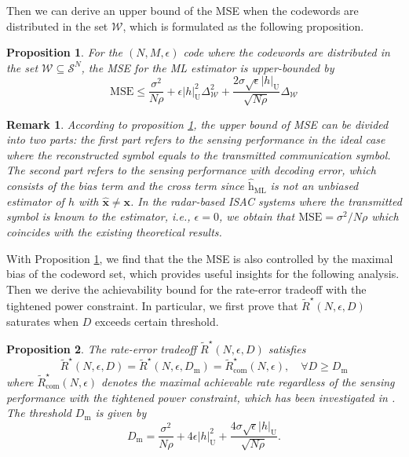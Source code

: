 \documentclass[conference,a4paper]{IEEEtran}
\newtheorem{proposition}{Proposition}
\newtheorem{remark}{Remark}
\begin{document}
Then we can derive an upper bound of the MSE when the codewords are distributed in the set $\mathcal{W}$, which is formulated as the following proposition.
\begin{proposition}
\label{Pro:Error-upperbound}
For the $(N,M,\epsilon)$ code where the codewords are distributed in the set $\mathcal{W}\subseteq \mathcal{S}^N$, the MSE for the ML estimator is upper-bounded by
\begin{equation}
\mathrm{MSE}\leq \frac{\sigma^2}{N\rho}+\epsilon|h|_\mathrm{U}^2\Delta_{\mathcal{W}}^2+\frac{2\sigma\sqrt{\epsilon}|h|_\mathrm{U}}{\sqrt{N\rho}}\Delta_{\mathcal{W}}
\end{equation}
\end{proposition}

\begin{remark}
According to proposition \ref{Pro:Error-upperbound}, the upper bound of MSE can be divided into two parts: the first part refers to the sensing performance in the ideal case where the reconstructed symbol equals to the transmitted communication symbol. The second part refers to the sensing performance with decoding error, which consists of the bias term and the cross term since $\hat{\mathrm{h}}_\mathrm{ML}$ is not an unbiased estimator of $h$ with $\hat{\mathbf{x}}\neq \mathbf{x}$. In the radar-based ISAC systems where the transmitted symbol is known to the estimator, i.e., $\epsilon = 0$, we obtain that $\mathrm{MSE} = \sigma^2/N\rho$ which coincides with the existing theoretical results. 
\end{remark}

With Proposition \ref{Pro:Error-upperbound}, we find that the the MSE is also controlled by the maximal bias of the codeword set, which provides useful insights for the following analysis. Then we derive the achievability bound for the rate-error tradeoff with the tightened power constraint. In particular, we first prove that $\tilde{R}^\star(N,\epsilon,D)$  saturates when $D$ exceeds certain threshold.
\begin{proposition}
\label{Pro:Saturate}
    The rate-error tradeoff $\tilde{R}^\star(N,\epsilon,D)$ satisfies
    \begin{equation}
         \tilde{R}^\star(N,\epsilon,D) = \tilde{R}^\star(N,\epsilon,D_\mathrm{m}) = \tilde{R}_\mathrm{com}^\star(N,\epsilon) ,\quad \forall D\geq D_\mathrm{m} 
    \end{equation}
    where $\tilde{R}_\mathrm{com}^\star(N,\epsilon)$ denotes the maximal achievable rate regardless of the sensing performance with the tightened power constraint, which has been investigated in \cite{YanDurKoc:C13,YanDurKoc:J10}. The threshold $D_\mathrm{m}$ is given by
    \begin{equation}
    \label{Maximal-error}
        D_\mathrm{m} = \frac{\sigma^2}{N\rho}+4\epsilon|h|_\mathrm{U}^2+\frac{4\sigma\sqrt{\epsilon}|h|_\mathrm{U}}{\sqrt{N\rho}}.
    \end{equation}
\end{proposition}
\end{document}

